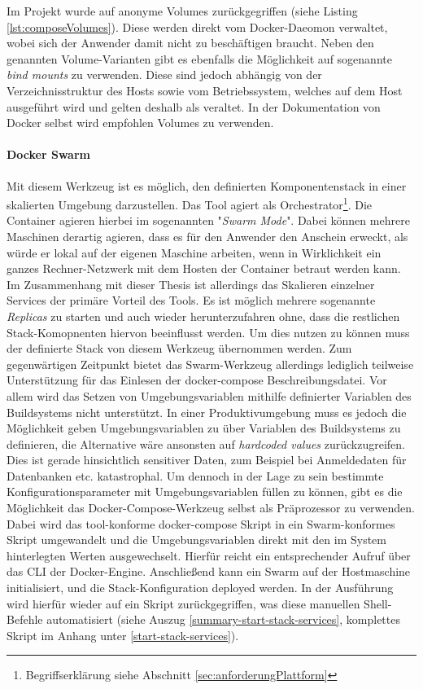 Im Projekt wurde auf anonyme Volumes zurückgegriffen (siehe Listing \ref{lst:composeVolumes}). Diese werden direkt vom Docker-Daeomon verwaltet, wobei sich der Anwender damit nicht zu beschäftigen braucht. Neben den genannten Volume-Varianten gibt es ebenfalls die Möglichkeit auf sogenannte \emph{bind mounts} zu verwenden. Diese sind jedoch abhängig von der Verzeichnisstruktur des Hosts sowie vom Betriebssystem, welches auf dem Host ausgeführt wird und gelten deshalb als veraltet. In der Dokumentation von Docker selbst wird empfohlen Volumes zu verwenden.

\paragraph{Docker Swarm \checkmark}
Mit diesem Werkzeug ist es möglich, den definierten Komponentenstack in einer skalierten Umgebung darzustellen. Das Tool agiert als Orchestrator\footnote{Begriffserklärung siehe Abschnitt \ref{sec:anforderungPlattform}}. Die Container agieren hierbei im sogenannten "\emph{Swarm Mode}". Dabei können mehrere Maschinen derartig agieren, dass es für den Anwender den Anschein erweckt, als würde er lokal auf der eigenen Maschine arbeiten, wenn in Wirklichkeit ein ganzes Rechner-Netzwerk mit dem Hosten der Container betraut werden kann. Im Zusammenhang mit dieser Thesis ist allerdings das Skalieren einzelner Services der primäre Vorteil des Tools. Es ist möglich mehrere sogenannte \emph{Replicas} zu starten und auch wieder herunterzufahren ohne, dass die restlichen Stack-Komopnenten hiervon beeinflusst werden. Um dies nutzen zu können muss der definierte Stack von diesem Werkzeug übernommen werden. Zum gegenwärtigen Zeitpunkt bietet das Swarm-Werkzeug allerdings lediglich teilweise Unterstützung für das Einlesen der docker-compose Beschreibungsdatei. Vor allem wird das Setzen von Umgebungsvariablen mithilfe definierter Variablen des Buildsystems nicht unterstützt. In einer Produktivumgebung muss es jedoch die Möglichkeit geben Umgebungsvariablen zu über Variablen des Buildsystems zu definieren, die Alternative wäre ansonsten auf \emph{hardcoded values} zurückzugreifen. Dies ist gerade hinsichtlich sensitiver Daten, zum Beispiel bei Anmeldedaten für Datenbanken etc. katastrophal. Um dennoch in der Lage zu sein bestimmte Konfigurationsparameter mit Umgebungsvariablen füllen zu können, gibt es die Möglichkeit das Docker-Compose-Werkzeug selbst als Präprozessor zu verwenden. Dabei wird das tool-konforme docker-compose Skript in ein Swarm-konformes Skript umgewandelt und die Umgebungsvariablen direkt mit den im System hinterlegten Werten ausgewechselt. Hierfür reicht ein entsprechender Aufruf über das CLI der Docker-Engine. Anschließend kann ein Swarm auf der Hostmaschine initialisiert, und die Stack-Konfiguration deployed werden. In der Ausführung wird hierfür wieder auf ein Skript zurückgegriffen, was diese manuellen Shell-Befehle automatisiert (siehe Auszug \ref{summary-start-stack-services}, komplettes Skript im Anhang unter \ref{start-stack-services}).

